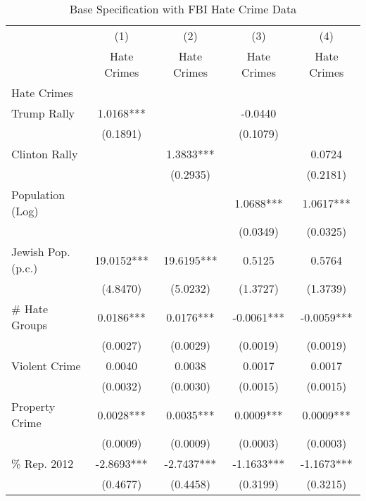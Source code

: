 \begin{table}[htbp]\centering
\def\sym#1{\ifmmode^{#1}\else\(^{#1}\)\fi}
\caption{Base Specification with FBI Hate Crime Data}
\begin{tabular}{l*{4}{c}}
\hline\hline
                    &\multicolumn{1}{c}{(1)}   &\multicolumn{1}{c}{(2)}   &\multicolumn{1}{c}{(3)}   &\multicolumn{1}{c}{(4)}   \\
                    & Hate Crimes   & Hate Crimes   & Hate Crimes   & Hate Crimes   \\
\hline
Hate Crimes         &               &               &               &               \\
Trump Rally         &      1.0168***&               &     -0.0440   &               \\
                    &    (0.1891)   &               &    (0.1079)   &               \\
Clinton Rally       &               &      1.3833***&               &      0.0724   \\
                    &               &    (0.2935)   &               &    (0.2181)   \\
Population (Log)    &               &               &      1.0688***&      1.0617***\\
                    &               &               &    (0.0349)   &    (0.0325)   \\
Jewish Pop. (p.c.)  &     19.0152***&     19.6195***&      0.5125   &      0.5764   \\
                    &    (4.8470)   &    (5.0232)   &    (1.3727)   &    (1.3739)   \\
# Hate Groups       &      0.0186***&      0.0176***&     -0.0061***&     -0.0059***\\
                    &    (0.0027)   &    (0.0029)   &    (0.0019)   &    (0.0019)   \\
Violent Crime       &      0.0040   &      0.0038   &      0.0017   &      0.0017   \\
                    &    (0.0032)   &    (0.0030)   &    (0.0015)   &    (0.0015)   \\
Property Crime      &      0.0028***&      0.0035***&      0.0009***&      0.0009***\\
                    &    (0.0009)   &    (0.0009)   &    (0.0003)   &    (0.0003)   \\
\% Rep. 2012        &     -2.8693***&     -2.7437***&     -1.1633***&     -1.1673***\\
                    &    (0.4677)   &    (0.4458)   &    (0.3199)   &    (0.3215)   \\

\end{tabular}
\end{table}
